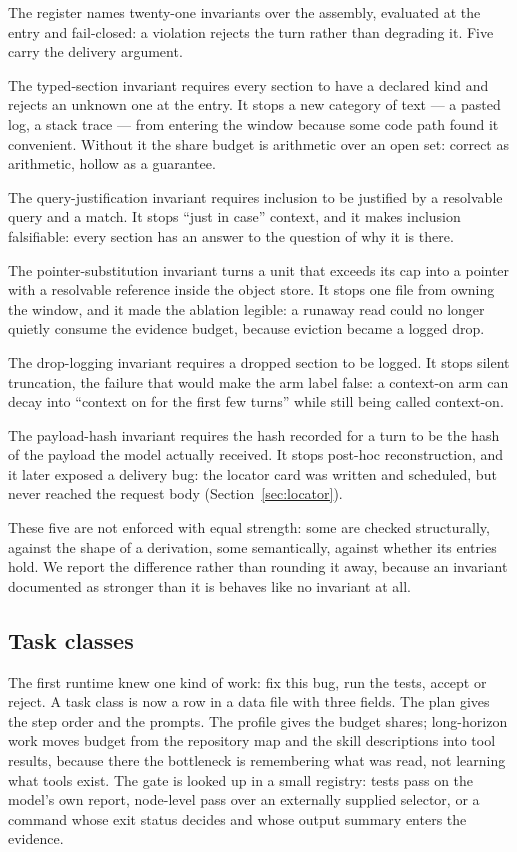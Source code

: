 The register names twenty-one invariants over the assembly, evaluated at the
entry and fail-closed: a violation rejects the turn rather than degrading it.
Five carry the delivery argument.

The typed-section invariant requires every section to have a declared kind and rejects an
unknown one at the entry. It stops a new category of text --- a pasted log, a
stack trace --- from entering the window because some code path found it
convenient. Without it the share budget is arithmetic over an open set: correct
as arithmetic, hollow as a guarantee.

The query-justification invariant requires inclusion to be justified by a resolvable query and
a match. It stops ``just in case'' context, and it makes inclusion falsifiable:
every section has an answer to the question of why it is there.

The pointer-substitution invariant turns a unit that exceeds its cap into a pointer with a
resolvable reference inside the object store. It stops one file from owning the
window, and it made the ablation legible: a runaway read could no longer
quietly consume the evidence budget, because eviction became a logged drop.

The drop-logging invariant requires a dropped section to be logged. It stops silent
truncation, the failure that would make the arm label false: a context-on arm
can decay into ``context on for the first few turns'' while still being called
context-on.

The payload-hash invariant requires the hash recorded for a turn to be the hash of the
payload the model actually received. It stops post-hoc reconstruction, and it
later exposed a delivery bug: the locator card was written and scheduled, but
never reached the request body (Section~\ref{sec:locator}).

These five are not enforced with equal strength: some are checked structurally,
against the shape of a derivation, some semantically, against whether its
entries hold. We report the difference rather than rounding it away, because an
invariant documented as stronger than it is behaves like no invariant at all.

\subsection{Task classes}

The first runtime knew one kind of work: fix this bug, run the tests, accept or
reject. A task class is now a row in a data file with three fields. The plan
gives the step order and the prompts. The profile gives the budget shares;
long-horizon work moves budget from the repository map and the skill
descriptions into tool results, because there the bottleneck is remembering
what was read, not learning what tools exist. The gate is looked up
in a small registry: tests pass on the model's own report, node-level pass over
an externally supplied selector, or a command whose exit status decides and
whose output summary enters the evidence.

